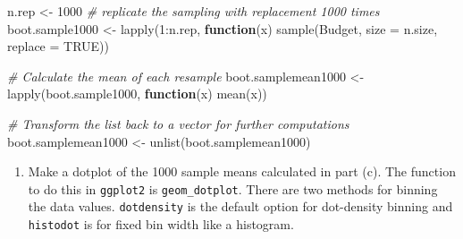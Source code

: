 \documentclass[
]{book}
\newenvironment{Shaded}{\begin{snugshade}}{\end{snugshade}}
\newcommand{\AttributeTok}[1]{\textcolor[rgb]{0.77,0.63,0.00}{#1}}
\newcommand{\CommentTok}[1]{\textcolor[rgb]{0.56,0.35,0.01}{\textit{#1}}}
\newcommand{\ConstantTok}[1]{\textcolor[rgb]{0.00,0.00,0.00}{#1}}
\newcommand{\ControlFlowTok}[1]{\textcolor[rgb]{0.13,0.29,0.53}{\textbf{#1}}}
\newcommand{\DecValTok}[1]{\textcolor[rgb]{0.00,0.00,0.81}{#1}}
\newcommand{\FunctionTok}[1]{\textcolor[rgb]{0.00,0.00,0.00}{#1}}
\newcommand{\NormalTok}[1]{#1}
\newcommand{\OtherTok}[1]{\textcolor[rgb]{0.56,0.35,0.01}{#1}}
\newcommand{\SpecialCharTok}[1]{\textcolor[rgb]{0.00,0.00,0.00}{#1}}
\providecommand{\tightlist}{%
  \setlength{\itemsep}{0pt}\setlength{\parskip}{0pt}}
\begin{document}
\begin{Shaded}
\begin{Highlighting}[]
\NormalTok{n.rep }\OtherTok{\textless{}{-}} \DecValTok{1000}
\CommentTok{\# replicate the sampling with replacement 1000 times}
\NormalTok{boot.sample1000 }\OtherTok{\textless{}{-}} \FunctionTok{lapply}\NormalTok{(}\DecValTok{1}\SpecialCharTok{:}\NormalTok{n.rep, }\ControlFlowTok{function}\NormalTok{(x) }\FunctionTok{sample}\NormalTok{(Budget, }\AttributeTok{size =}\NormalTok{ n.size, }\AttributeTok{replace =} \ConstantTok{TRUE}\NormalTok{))}

\CommentTok{\# Calculate the mean of each resample}
\NormalTok{boot.samplemean1000 }\OtherTok{\textless{}{-}} \FunctionTok{lapply}\NormalTok{(boot.sample1000, }\ControlFlowTok{function}\NormalTok{(x) }\FunctionTok{mean}\NormalTok{(x))}

\CommentTok{\# Transform the list back to a vector for further computations}
\NormalTok{boot.samplemean1000 }\OtherTok{\textless{}{-}} \FunctionTok{unlist}\NormalTok{(boot.samplemean1000)}
\end{Highlighting}
\end{Shaded}

\begin{enumerate}
\def\labelenumi{(\alph{enumi})}
\setcounter{enumi}{3}
\tightlist
\item
  Make a dotplot of the 1000 sample means calculated in part (c). The function to do this in \texttt{ggplot2} is \texttt{geom\_dotplot}. There are two methods for binning the data values. \texttt{dotdensity} is the default option for dot-density binning and \texttt{histodot} is for fixed bin width like a histogram.
\end{enumerate}
\end{document}
